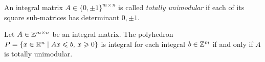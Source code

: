 


\begin{definition}
  \label{def:skip1}  
  An integral matrix $A \in \{0 , \pm 1\}^{m\times n}$ is
  called \emph{totally
  unimodular} if each of its square sub-matrices has
  determinant
  $0,\pm1$.
\end{definition}
   

\begin{theorem}
  \label{po:thr:16}
  Let $A\in \mathbb{Z}^{m\times n}$ be an integral matrix. The polyhedron $P = \{ x
  \in \mathbb{R}^n \mid Ax\leqslant b, \, x\geqslant0\}$ is integral for each integral $b \in
  \mathbb{Z}^m$ if and only if $A$ is totally unimodular. 
\end{theorem}


